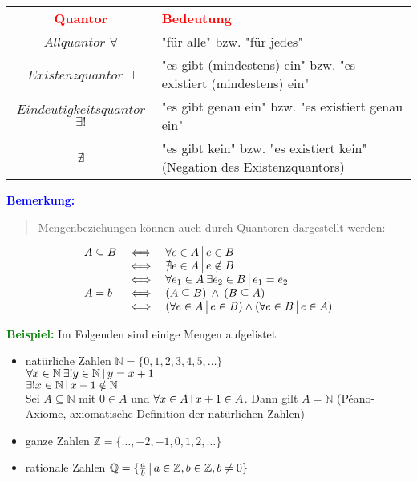 \documentclass{article}
\newcommand{\smsp}{\phantom{\hspace{3px}}}
\newcommand{\red}[1]{\textcolor{red}{#1}}
\newcommand{\blue}[1]{\textcolor{blue}{#1}}
\newcommand{\green}[1]{\textcolor{green}{#1}}
\newcommand{\ex}{\green{\textbf{Beispiel: }}}
\newcommand{\an}[1]{\blue{\textbf{Bemerkung: }}\begin{quote}#1\end{quote}}
\newcommand{\N}{\mathbb{N}}
\newcommand{\Z}{\mathbb{Z}}
\newcommand{\Q}{\mathbb{Q}}
\newcommand{\vst}{\smsp \vline \smsp}
\begin{document}
\begin{table}[ht]
    \centering
    \begin{tabular}{c p{7cm}}
        \textbf{\red{Quantor}} & \textbf{\red{Bedeutung}}\\
        $Allquantor$ $\forall$ & "für alle" bzw. "für jedes"\\
        $Existenzquantor$ $\exists$ & "es gibt (mindestens) ein" bzw. "es existiert (mindestens) ein"\\
        $Eindeutigkeitsquantor$ $\exists!$ & "es gibt genau ein" bzw. "es existiert genau ein"\\
        $\nexists$ & "es gibt kein" bzw. "es existiert kein" (Negation des Existenzquantors)
    \end{tabular}
\end{table}

\an{Mengenbeziehungen können auch durch Quantoren dargestellt werden:}

\begin{equation*}
    \begin{array}{lcl}
        A \subseteq B & \iff & \forall e \in A \vst e \in B\\
                      & \iff & \nexists e \in A\vst e \notin B\\
                      & \iff & \forall e_1 \in A \: \exists e_2 \in B \vst e_1 = e_2\\
        A = b         & \iff & (A \subseteq B) \: \land \: (B \subseteq A)\\
                      & \iff & (\forall e \in A \vst e \in B) \land (\forall e \in B \vst e \in A)
    \end{array}
\end{equation*}

\ex Im Folgenden sind einige Mengen aufgelistet

\begin{itemize}
    \item natürliche Zahlen $\N = \{0, 1, 2, 3, 4, 5, \dots\}$\\
    $\forall x \in \N \: \exists!y \in \N \vst y = x + 1$\\
    $\exists! x \in \N \vst x - 1 \notin \N$\\
    Sei $A \subseteq \N$ mit $0 \in A$ und $\forall x \in A \vst x + 1 \in A$. Dann gilt $A = \N$ (Péano-Axiome, axiomatische Definition der natürlichen Zahlen)
    \item ganze Zahlen $\Z = \{\dots, -2, -1, 0, 1, 2, \dots\}$
    \item rationale Zahlen $\Q = \{\frac{a}{b} \vst a \in \Z, b \in \Z, b \neq 0\}$
\end{itemize}
\end{document}
